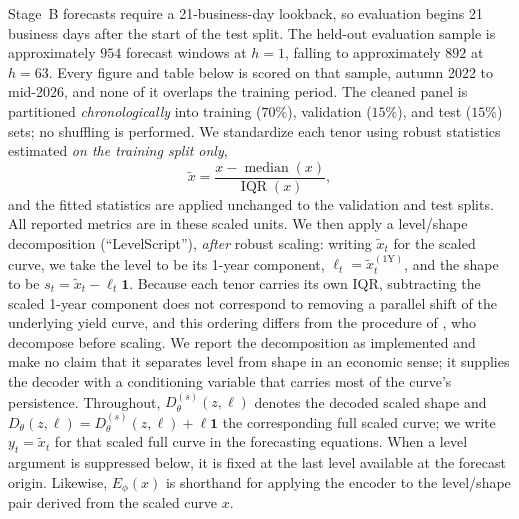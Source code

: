 \documentclass{article} %
\begin{document}
Stage~B forecasts require a 21-business-day lookback, so evaluation begins 21
business days after the start of the test split. The held-out evaluation sample is
approximately $954$ forecast windows at $h{=}1$, falling to approximately $892$ at
$h{=}63$. Every figure and table below is scored on that sample, autumn 2022 to
mid-2026, and none of it overlaps the training period.
The cleaned panel is partitioned \emph{chronologically} into training ($70\%$),
validation ($15\%$), and test ($15\%$) sets; no shuffling is performed. We
standardize each tenor using robust statistics estimated \emph{on the training split
only},
\begin{equation}
  \tilde{x} = \frac{x - \operatorname{median}(x)}{\operatorname{IQR}(x)},
\end{equation}
and the fitted statistics are applied unchanged to the validation and test splits.
All reported metrics are in these scaled units.
We then apply a level/shape decomposition (``LevelScript''), \emph{after} robust
scaling: writing $\tilde{x}_t$ for the scaled curve, we take the level to be its
1-year component, $\ell_t = \tilde{x}_t^{(\mathrm{1Y})}$, and the shape to be
$s_t = \tilde{x}_t - \ell_t \mathbf{1}$. Because each tenor carries its own IQR,
subtracting the scaled 1-year component does not correspond to removing a parallel
shift of the underlying yield curve, and this ordering differs from the procedure of
\citet{NoArbVAEYieldCurves}, who decompose before scaling. We report the
decomposition as implemented and make no claim that it separates level from shape in
an economic sense; it supplies the decoder with a conditioning variable that carries
most of the curve's persistence.
Throughout, $D_\theta^{(s)}(z,\ell)$ denotes the decoded scaled shape and
$D_\theta(z,\ell)=D_\theta^{(s)}(z,\ell)+\ell\mathbf{1}$ the corresponding full
scaled curve; we write $y_t=\tilde{x}_t$ for that scaled full curve in the
forecasting equations. When a level argument is suppressed below, it is fixed at
the last level available at the forecast origin. Likewise, $E_\phi(x)$ is
shorthand for applying the encoder to the level/shape pair derived from the scaled
curve $x$.
\end{document}
